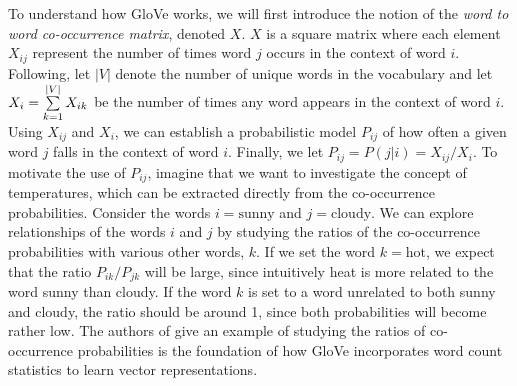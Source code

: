 To understand how GloVe works, we will first introduce the notion of the \textit{word to word co-occurrence matrix}, denoted $X$. $X$ is a square matrix where each element $X_{ij}$ represent the number of times word $j$ occurs in the context of word $i$. Following, let $|V|$ denote the number of unique words in the vocabulary and let $X_i=\sum\limits_{k=1}^{|V|} X_{ik}$ be the number of times any word appears in the context of word $i$. Using $X_{ij}$ and $X_i$, we can establish a probabilistic model $P_{ij}$ of how often a given word $j$ falls in the context of word $i$. Finally, we let $P_{ij}=P(j|i)=X_{ij} / {X_i}$. To motivate the use of $P_{ij}$, imagine that we want to investigate the concept of temperatures, which can be extracted directly from the co-occurrence probabilities. Consider the words $i = \text{sunny}$ and $j = \text{cloudy}$. We can explore relationships of the words $i$ and $j$ by studying the ratios of the co-occurrence probabilities with various other words, $k$. If we set the word $k = \text{hot}$, we expect that the ratio $P_{ik} / P_{jk}$ will be large, since intuitively heat is more related to the word sunny than cloudy. If the word $k$ is set to a word unrelated to both sunny and cloudy, the ratio should be around 1, since both probabilities will become rather low. The authors of \cite{pennington2014glove} give an example of studying the ratios of co-occurrence probabilities is the foundation of how GloVe incorporates word count statistics to learn vector representations.

